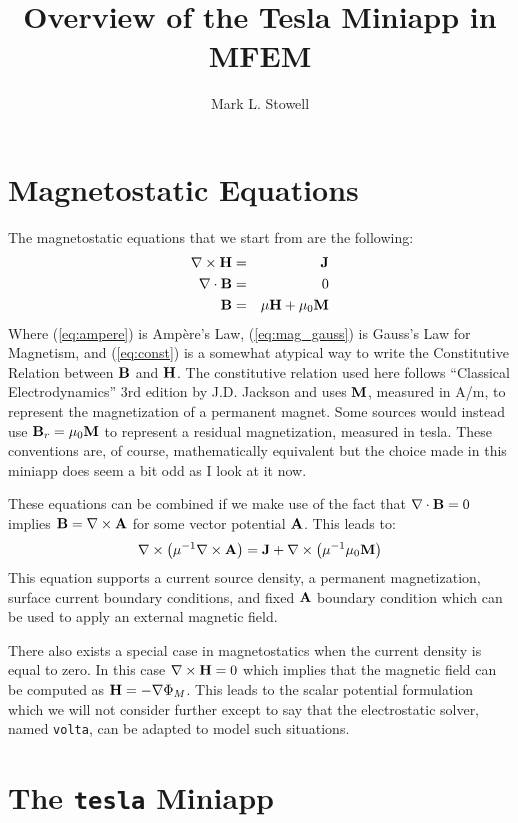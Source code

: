 \documentclass[12pt]{article}
\title{Overview of the Tesla Miniapp in MFEM}
\author{Mark L. Stowell}
\providecommand{\A}{\mbox{\bf A}}
\providecommand{\B}{\mbox{\bf B}}
\renewcommand{\H}{\mbox{\bf H}}
\providecommand{\J}{\mbox{\bf J}}
\providecommand{\M}{\mbox{\bf M}}
\newcommand{\refEq}[1]{(\ref{eq:#1})}
\newcommand{\Div}{\nabla\cdot}
\newcommand{\Curl}{\nabla\times}
\newcommand{\Grad}{\nabla}
\begin{document}
\maketitle

\section{Magnetostatic Equations}

The magnetostatic equations that we start from are the following:
\begin{eqnarray}
  \Curl\H &=& \J \label{eq:ampere}\\
  \Div\B &=& 0 \label{eq:mag_gauss}\\
  \B &=& \mu\H+\mu_0\M \label{eq:const}
\end{eqnarray}
Where \refEq{ampere} is Amp\`ere's Law, \refEq{mag_gauss} is Gauss's
Law for Magnetism, and \refEq{const} is a somewhat atypical way to
write the Constitutive Relation between $\B$ and $\H$. The
constitutive relation used here follows ``Classical Electrodynamics''
3rd edition by J.D. Jackson and uses $\M$, measured in A/m, to
represent the magnetization of a permanent magnet. Some sources would
instead use $\B_r=\mu_0\M$ to represent a residual magnetization,
measured in tesla. These conventions are, of course, mathematically
equivalent but the choice made in this miniapp does seem a bit odd as
I look at it now.

These equations can be combined if we make use of the fact that
$\Div\B=0$ implies $\B=\Curl\A$ for some vector potential $\A$. This leads to:
\[\Curl\left(\mu^{-1}\Curl\A\right) = \J + \Curl\left(\mu^{-1}\mu_0\M\right)\]
This equation supports a current source density, a permanent
magnetization, surface current boundary conditions, and fixed $\A$
boundary condition which can be used to apply an external magnetic
field.

There also exists a special case in magnetostatics when the current
density is equal to zero. In this case $\Curl\H=0$ which implies that
the magnetic field can be computed as $\H=-\Grad\Phi_M$. This leads
to the scalar potential formulation which we will not consider further
except to say that the electrostatic solver, named {\tt volta}, can be
adapted to model such situations.

\section{The {\tt tesla} Miniapp}
\end{document}

